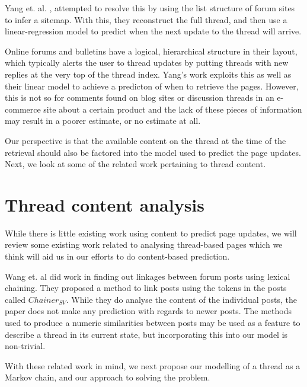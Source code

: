 Yang et. al. \cite{Yang2009}, attempted to resolve this by using the list 
structure of forum sites to infer a sitemap. With this, they reconstruct the 
full thread, and then use a linear-regression model to predict when the next 
update to the thread will arrive. %

Online forums and bulletins have a logical, hierarchical structure in their 
layout, which typically alerts the user to thread updates by putting threads 
with new replies at the very top of the thread index. Yang's work exploits this 
as well as their linear model to achieve a predicton of when to retrieve the 
pages.
However, this is not so for comments found on blog sites or discussion threads 
in an e-commerce site about a certain product and the lack of these pieces of 
information may result in a poorer estimate, or no estimate at all.


Our perspective is that the available content on the thread at the time of the 
retrieval should also be factored into the model used to predict the page 
updates. Next, we look at some of the related work pertaining to thread content.

\section{Thread content analysis}
While there is little existing work using content to predict page updates, we 
will review some existing work related to analysing thread-based pages which we 
think will aid us in our efforts to do content-based prediction.

Wang et. al \cite{Wang2011} did work in finding out linkages between forum posts 
using lexical chaining. They proposed a method to link posts using the tokens in 
the posts called $Chainer_{SV}$. While they do analyse the content of the 
individual posts, the paper does not make any prediction with regards to newer 
posts. The methods used to produce a numeric similarities between posts may be 
used as a feature to describe a thread in its current state, but incorporating 
this into our model is non-trivial.




With these related work in mind, we next propose our modelling of a thread as a 
Markov chain, and our approach to solving the problem.

